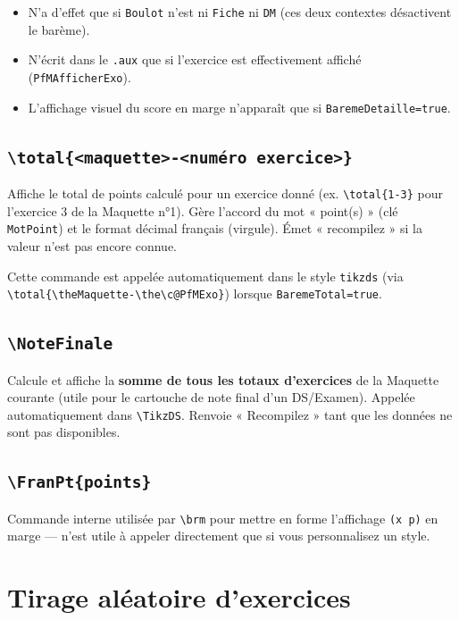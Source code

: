 \documentclass[11pt,a4paper]{article}
\newcommand{\cmdname}[1]{\texttt{\textbackslash#1}}
\begin{document}
\begin{itemize}
  \item N'a d'effet que si \texttt{Boulot} n'est ni \texttt{Fiche} ni \texttt{DM} (ces deux contextes désactivent le barème).
  \item N'écrit dans le \texttt{.aux} que si l'exercice est effectivement affiché (\texttt{PfMAfficherExo}).
  \item L'affichage visuel du score en marge n'apparaît que si \texttt{BaremeDetaille=true}.
\end{itemize}

\subsection{\cmdname{total\{<maquette>-<numéro exercice>\}}}

Affiche le total de points calculé pour un exercice donné (ex. \texttt{\textbackslash total\{1-3\}} pour l'exercice 3 de la Maquette n°1). Gère l'accord du mot « point(s) » (clé \texttt{MotPoint}) et le format décimal français (virgule). Émet « recompilez » si la valeur n'est pas encore connue.

Cette commande est appelée automatiquement dans le style \texttt{tikzds} (via \texttt{\textbackslash total\{\textbackslash theMaquette-\textbackslash the\textbackslash c@PfMExo\}}) lorsque \texttt{BaremeTotal=true}.

\subsection{\cmdname{NoteFinale}}

Calcule et affiche la \textbf{somme de tous les totaux d'exercices} de la Maquette courante (utile pour le cartouche de note final d'un DS/Examen). Appelée automatiquement dans \cmdname{TikzDS}. Renvoie « Recompilez » tant que les données ne sont pas disponibles.

\subsection{\cmdname{FranPt\{points\}}}

Commande interne utilisée par \cmdname{brm} pour mettre en forme l'affichage \texttt{(x p)} en marge — n'est utile à appeler directement que si vous personnalisez un style.

\section{Tirage aléatoire d'exercices}
\label{sec:tirage}
\end{document}
